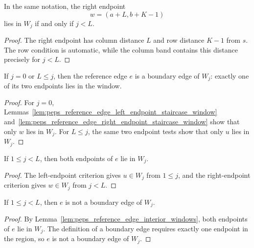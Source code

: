 \begin{lemma}%
    \label{lem:peps_reference_edge_right_endpoint_staircase_window}
    \leanok
    In the same notation, the right endpoint
    \[
        w=(a+L,b+K-1)
    \]
    lies in $W_j$ if and only if $j<L$.
\end{lemma}
\begin{proof}\leanok
    The right endpoint has column distance $L$ and row distance $K-1$ from
    $s$. The row condition is automatic, while the column band contains this
    distance precisely for $j<L$.
\end{proof}

\begin{lemma}%
    \label{lem:peps_reference_edge_boundary_windows}
    \leanok
    If $j=0$ or $L\le j$, then the reference edge $e$ is a boundary edge
    of $W_j$: exactly one of its two endpoints lies in the window.
\end{lemma}
\begin{proof}\leanok
    For $j=0$, Lemmas~\ref{lem:peps_reference_edge_left_endpoint_staircase_window}
    and~\ref{lem:peps_reference_edge_right_endpoint_staircase_window} show that
    only $w$ lies in $W_j$. For $L\le j$, the same two endpoint tests show
    that only $u$ lies in $W_j$.
\end{proof}

\begin{lemma}%
    \label{lem:peps_reference_edge_interior_windows}
    \leanok
    If $1\le j<L$, then both endpoints of $e$ lie in $W_j$.
\end{lemma}
\begin{proof}\leanok
    The left-endpoint criterion gives $u\in W_j$ from $1\le j$, and the
    right-endpoint criterion gives $w\in W_j$ from $j<L$.
\end{proof}

\begin{lemma}%
    \label{lem:peps_reference_edge_not_boundary_interior_windows}
    \leanok
    If $1\le j<L$, then $e$ is not a boundary edge of $W_j$.
\end{lemma}
\begin{proof}\leanok
    By Lemma~\ref{lem:peps_reference_edge_interior_windows}, both endpoints of
    $e$ lie in $W_j$. The definition of a boundary edge requires exactly one
    endpoint in the region, so $e$ is not a boundary edge of $W_j$.
\end{proof}

